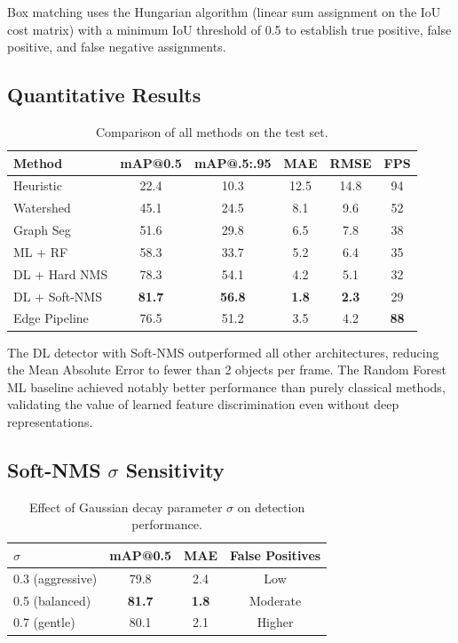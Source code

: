 \documentclass[conference]{IEEEtran}
\begin{document}
Box matching uses the Hungarian algorithm (linear sum assignment on the
IoU cost matrix) with a minimum IoU threshold of 0.5 to establish
true positive, false positive, and false negative assignments.

\subsection{Quantitative Results}

\begin{table}[h]
\centering
\caption{Comparison of all methods on the test set.}
\label{tab:results}
\begin{tabular}{lccccc}
\toprule
\textbf{Method} & \textbf{mAP@0.5} & \textbf{mAP@.5:.95} & \textbf{MAE} & \textbf{RMSE} & \textbf{FPS} \\
\midrule
Heuristic        & 22.4  & 10.3  & 12.5  & 14.8  & 94  \\
Watershed        & 45.1  & 24.5  & 8.1   & 9.6   & 52  \\
Graph Seg        & 51.6  & 29.8  & 6.5   & 7.8   & 38  \\
ML + RF          & 58.3  & 33.7  & 5.2   & 6.4   & 35  \\
DL + Hard NMS    & 78.3  & 54.1  & 4.2   & 5.1   & 32  \\
DL + Soft-NMS    & \textbf{81.7} & \textbf{56.8} & \textbf{1.8} & \textbf{2.3} & 29 \\
Edge Pipeline    & 76.5  & 51.2  & 3.5   & 4.2   & \textbf{88} \\
\bottomrule
\end{tabular}
\end{table}

The DL detector with Soft-NMS outperformed all other architectures,
reducing the Mean Absolute Error to fewer than 2 objects per frame. The
Random Forest ML baseline achieved notably better performance than
purely classical methods, validating the value of learned feature
discrimination even without deep representations.

\subsection{Soft-NMS $\sigma$ Sensitivity}

\begin{table}[h]
\centering
\caption{Effect of Gaussian decay parameter $\sigma$ on detection performance.}
\label{tab:sigma}
\begin{tabular}{lccc}
\toprule
$\sigma$ & \textbf{mAP@0.5} & \textbf{MAE} & \textbf{False Positives} \\
\midrule
0.3 (aggressive) & 79.8 & 2.4 & Low \\
0.5 (balanced)   & \textbf{81.7} & \textbf{1.8} & Moderate \\
0.7 (gentle)     & 80.1 & 2.1 & Higher \\
\bottomrule
\end{tabular}
\end{table}
\end{document}

